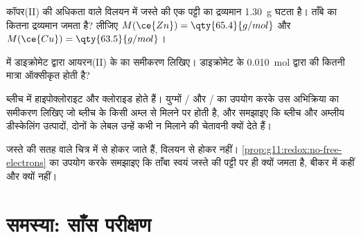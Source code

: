\begin{exercise}[$\star\star\star$]\label{exo:g11:redox:12}
कॉपर(II)  की अधिकता वाले विलयन में जस्ते की एक पट्टी का द्रव्यमान \qty{1.30}{g}
घटता है। ताँबे का कितना द्रव्यमान जमता है? लीजिए
$M(\ce{Zn}) = \qty{65.4}{g/mol}$ और $M(\ce{Cu}) = \qty{63.5}{g/mol}$।
\end{exercise}

\begin{exercise}[$\star\star\star$]\label{exo:g11:redox:13}
 में डाइक्रोमेट  द्वारा आयरन(II)  के  का
समीकरण लिखिए। डाइक्रोमेट  के \qty{0.010}{mol} द्वारा  की कितनी मात्रा
ऑक्सीकृत होती है?
\end{exercise}

\begin{exercise}[$\star\star\star$]\label{exo:g11:redox:14}
ब्लीच में हाइपोक्लोराइट   और क्लोराइड 
 होते हैं। युग्मों / और / का उपयोग करके
उस अभिक्रिया का समीकरण लिखिए जो ब्लीच के किसी अम्ल से मिलने पर होती है, और
समझाइए कि ब्लीच और अम्लीय डीस्केलिंग उत्पादों, दोनों के लेबल
उन्हें कभी न मिलाने की चेतावनी क्यों देते हैं।
\end{exercise}

\begin{exercise}[$\star\star\star$]\label{exo:g11:redox:15}
जस्ते की सतह वाले चित्र में   से होकर जाते हैं,
विलयन से होकर नहीं। \cref{prop:g11:redox:no-free-electrons} का उपयोग करके
समझाइए कि ताँबा स्वयं जस्ते की पट्टी पर ही क्यों जमता है, बीकर में
कहीं और क्यों नहीं।
\end{exercise}

\section{समस्या: साँस परीक्षण}

